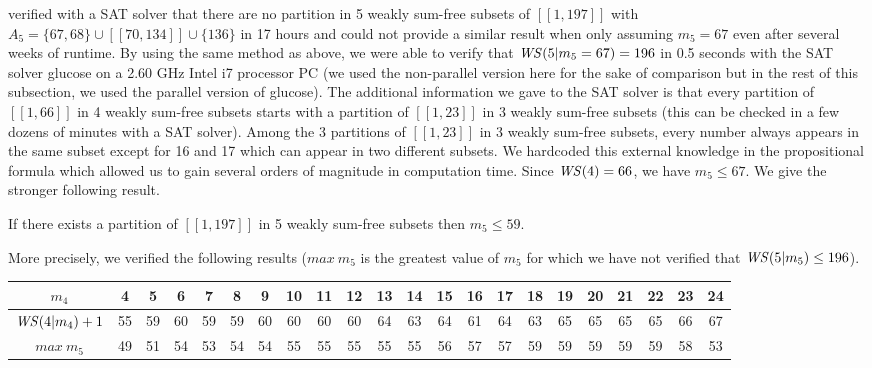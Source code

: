 \par
\cite{ELIAHOU2012175} verified with a SAT solver that there are no partition in 5 weakly sum-free subsets of
\([\![1,197]\!]\) with
\(A_5 = \{67, 68\} \cup [\![70,134]\!] \cup \{136\}\) in 17 hours and could not provide a similar result when only
assuming \(m_5 = 67\) even after several
weeks of runtime. By using the same method as above, we were able to verify that \(\mathit{WS} (5 | m_5 = 67) = 196\) in 0.5
seconds with the SAT solver glucose \cite{Glucose}
on a 2.60 GHz Intel i7 processor PC (we used the non-parallel version here for the sake of comparison but in the rest of
this subsection, we used the parallel version of glucose).
The additional information we gave to the SAT solver is that every partition of \([\![1,66]\!]\) in 4 weakly sum-free
subsets starts with a partition of
\([\![1,23]\!]\) in 3 weakly sum-free subsets (this can be checked in a few dozens of minutes with a SAT solver). Among
the 3 partitions of \([\![1,23]\!]\) in
3 weakly sum-free subsets, every number always appears in the same subset except for 16 and 17 which can appear in two
different subsets. We hardcoded
this external knowledge in the propositional formula which allowed us to gain several orders of magnitude in computation
time. Since \(\mathit{WS} (4) = 66\), we have \(m_5 \leqslant 67\). We give the stronger following result.

\begin{computational theorem}
If there exists a partition of \([\![1,197]\!]\) in 5 weakly sum-free subsets then \(m_5 \leqslant 59\).
\end{computational theorem}

More precisely, we verified the following results (\(max~m_5\) is the greatest value of \(m_5\) for which we have not
verified that \(\mathit{WS} (5 | m_5) \leq 196\)).

\renewcommand{\arraystretch}{1.5}
\setlength{\tabcolsep}{3pt}

\begin{center}
\begin{tabular}{| c | *{21}{c |}}
	\hline
	\(m_4\) & 4 & 5 & 6 & 7 & 8 & 9 & 10 & 11 & 12 & 13 & 14 & 15 & 16 & 17 & 18 & 19 & 20 & 21 & 22 & 23 & 24 \\
	\hline
	\(\mathit{WS} (4 | m_4) + 1\) & 55 & 59 & 60 & 59 & 59 & 60 & 60 & 60 & 60 & 64 & 63 & 64 & 61 & 64 & 63 & 65 & 65 & 65 & 65 & 66
	& 67 \\
	\hline
	\(max~m_5\) & 49 & 51 & 54 & 53 & 54 & 54 & 55 & 55 & 55 & 55 & 55 & 56 & 57 & 57 & 59 & 59 & 59 & 59 & 59 & 58 & 53 \\
	\hline
\end{tabular}
\end{center}

